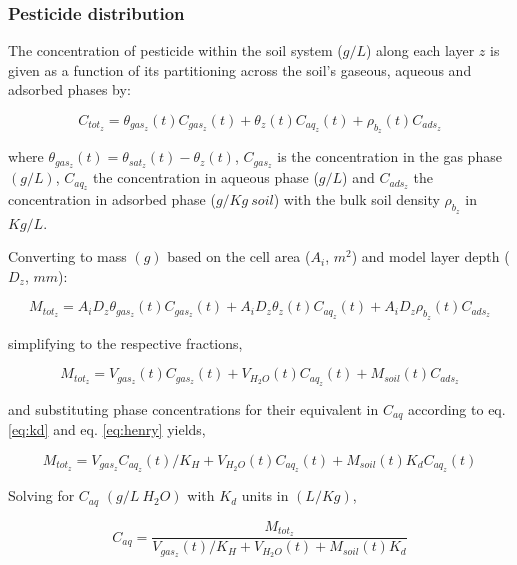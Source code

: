 \documentclass[]{article}
\begin{document}
\subsubsection{Pesticide distribution}\label{pesticide-distribution}

The concentration of pesticide within the soil system (\(g/L\)) along
each layer \(z\) is given as a function of its partitioning across the
soil's gaseous, aqueous and adsorbed phases by:

\begin{equation}
C_{tot_z} = \theta_{gas_z}(t)C_{gas_z}(t) + \theta_z(t)C_{aq_z}(t) + \rho_{b_z}(t)C_{ads_z}
\label{eq:conc_tot}  
\end{equation}

where \(\theta_{gas_z}(t) = \theta_{sat_z}(t) - \theta_{z}(t)\),
\(C_{gas_z}\) is the concentration in the gas phase \((g/L)\),
\(C_{aq_z}\) the concentration in aqueous phase (\(g/L\)) and
\(C_{ads_z}\) the concentration in adsorbed phase (\(g/Kg~soil\)) with
the bulk soil density \(\rho_{b_z}\) in \(Kg/L\).

Converting to mass \((g)\) based on the cell area (\(A_i\), \(m^2\)) and
model layer depth (\(D_z\), \(mm\)):

\begin{equation}
M_{tot_z} = A_iD_z\theta_{gas_z}(t)C_{gas_z}(t) + A_iD_z\theta_z(t)C_{aq_z}(t) + A_iD_z\rho_{b_z}(t)C_{ads_z}
\label{eq:mass_tot}  
\end{equation}

simplifying to the respective fractions,

\begin{equation}
M_{tot_z} = V_{gas_z}(t)C_{gas_z}(t) + V_{H_2O}(t)C_{aq_z}(t) + M_{soil}(t)C_{ads_z}
\label{eq:mass_tot_simple}  
\end{equation}

and substituting phase concentrations for their equivalent in \(C_{aq}\)
according to eq. \ref{eq:kd} and eq. \ref{eq:henry} yields,

\begin{equation}
M_{tot_z} = V_{gas_z}C_{aq_z}(t)/K_H + V_{H_2O}(t)C_{aq_z}(t) + M_{soil}(t)K_dC_{aq_z}(t)
\label{eq:mass_tot_sub}  
\end{equation}

Solving for \(C_{aq}\) \((g/L~H_2O)\) with \(K_d\) units in \((L/Kg)\),

\begin{equation}
C_{aq} = \frac{M_{tot_z} }{  V_{gas_z}(t)/K_H + V_{H_2O}(t) + M_{soil}(t)K_d }
\label{eq:mass_tot_conc_aq1}  
\end{equation}
\end{document}
